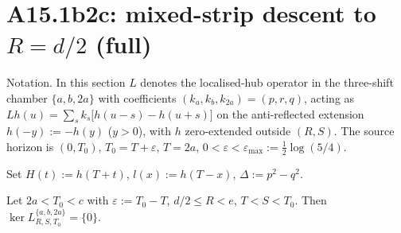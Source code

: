 \section{A15.1b2c: mixed-strip descent to $R = d/2$ (full)}
\label{sec:p12-b2c}

Notation.  In this section $L$ denotes the localised-hub operator
in the three-shift chamber $\{a, b, 2a\}$ with coefficients
$(k_{a}, k_{b}, k_{2a}) = (p, r, q)$, acting as
$Lh(u) = \sum_{s} k_{s}\bigl[h(u - s) - h(u + s)\bigr]$
on the anti-reflected extension $h(-y) := -h(y)$ ($y > 0$),
with $h$ zero-extended outside $(R, S)$.  The source horizon is
$(0, T_{0})$, $T_{0} = T + \varepsilon$, $T = 2a$,
$0 < \varepsilon < \varepsilon_{\max} := \tfrac12\log(5/4)$.

Set $H(t) := h(T + t)$, $l(x) := h(T - x)$, $\Delta := p^{2} - q^{2}$.

\begin{theorem}[Mixed-strip descent to $R = d/2$]
\label{thm:p12-b2c}
Let $2a < T_{0} < c$ with $\varepsilon := T_{0} - T$,
$d/2 \le R < e$, $T < S < T_{0}$.
Then $\ker L_{R, S, T_{0}}^{\{a, b, 2a\}} = \{0\}$.
\end{theorem}

